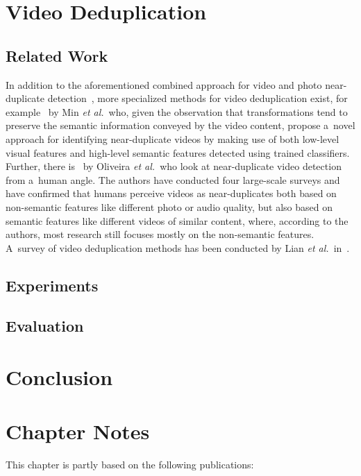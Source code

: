 \section{Video Deduplication}

\subsection{Related Work}

In addition to the aforementioned  combined approach
for video and photo near-duplicate
detection~\cite{yang2009nearduplicate},
more specialized methods for video deduplication exist,
for example~\cite{min2011nearduplicatevideo,wu2009nearduplicate}
by Min \emph{et al.}\ who, given the observation that 
transformations tend to preserve the semantic information conveyed
by the video content, propose a~novel approach for identifying
near-duplicate videos by making use of both low-level visual
features and high-level semantic features
detected using trained classifiers.
Further, there is~\cite{oliveira2010nearduplicate} by Oliveira
\emph{et al.}\ who look at near-duplicate video detection
from a~human angle.  
The authors have conducted four large-scale surveys
and have confirmed that humans perceive videos as near-duplicates
both based on non-semantic features like different photo or audio
quality, but also based on semantic features like different
videos of similar content, where, according to the authors,
most research still focuses mostly on the non-semantic features.
A~survey of video deduplication methods has been conducted by
Lian \emph{et al.}\ in~\cite{lian2010survey}.

\subsection{Experiments}

\subsection{Evaluation}

\section{Conclusion}

\section*{Chapter Notes}
This chapter is partly based on the following publications:
